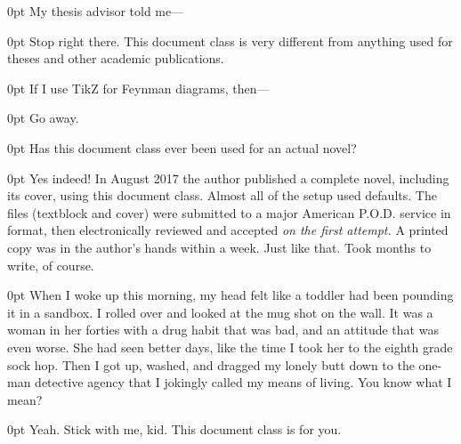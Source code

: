 \documentclass{novel} %
\begin{document}
\begin{adjustwidth}{\parindent}{0pt}
\backindent{}My thesis advisor told me---
\end{adjustwidth}
\begin{adjustwidth}{\parindent}{0pt}
\backindent{}Stop right there. This document class is very different from anything used for theses and other academic publications.
\end{adjustwidth}

\begin{adjustwidth}{\parindent}{0pt}
\backindent{}If I use TikZ for Feynman diagrams, then---
\end{adjustwidth}
\begin{adjustwidth}{\parindent}{0pt}
\backindent{}Go away.
\end{adjustwidth}

\begin{adjustwidth}{\parindent}{0pt}
\backindent{}Has this document class ever been used for an actual novel?
\end{adjustwidth}
\begin{adjustwidth}{\parindent}{0pt}
\backindent{}Yes indeed! In August 2017 the author published a complete novel, including its cover, using this document class. Almost all of the setup used defaults. The files (textblock and cover) were submitted to a major American P.O.D. service in  format, then electronically reviewed and accepted \textit{on the first attempt.} A printed copy was in the author's hands within a week. Just like that. Took months to write, of course.
\end{adjustwidth}

\begin{adjustwidth}{\parindent}{0pt}
\backindent{}When I woke up this morning, my head felt like a toddler had been pounding it in a sandbox. I rolled over and looked at the mug shot on the wall. It was a woman in her forties with a drug habit that
was bad, and an attitude that was even worse. She had seen better days, like the time I took her to the eighth grade sock hop. Then I got up, washed, and dragged my lonely butt down to the one-man detective agency that I jokingly called my means of living. You know what I mean?
\end{adjustwidth}
\begin{adjustwidth}{\parindent}{0pt}
\backindent{}Yeah. Stick with me, kid. This document class is for you.
\end{adjustwidth}
\end{document}
